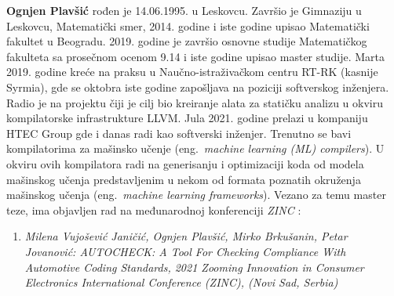 \documentclass[12pt,oneside]{memoir}
\begin{document}
\literatura

\backmatter

\begin{biografija}
  \textbf{Ognjen Plavšić} rođen je 14.06.1995. u Leskovcu. Zavr\v{s}io je Gimnaziju u Leskovcu, Matemati\v{c}ki smer, 2014. godine
  i iste godine upisao Matemati\v{c}ki fakultet u Beogradu. 2019. godine je zavr\v{s}io osnovne studije Matemati\v{c}kog fakulteta sa prose\v{c}nom ocenom 9.14 i iste
  godine upisao master studije. Marta 2019. godine kre\'{c}e na praksu u Nau\v{c}no-istra\v{z}iva\v{c}kom centru RT-RK (kasnije Syrmia), gde
  se oktobra iste godine zapo\v{s}ljava na poziciji softverskog in\v{z}enjera. Radio je na projektu \v{c}iji je cilj bio kreiranje alata za stati\v{c}ku analizu u okviru kompilatorske infrastrukture
  LLVM. Jula 2021. godine prelazi u kompaniju HTEC Group gde i danas
  radi kao softverski in\v{z}enjer. Trenutno se bavi kompilatorima za ma\v{s}insko u\v{c}enje
  (eng.~\textit{machine learning (ML) compilers}). U okviru ovih kompilatora radi na generisanju i optimizaciji koda od modela ma\v{s}inskog u\v{c}enja predstavljenim u nekom od formata poznatih okru\v{z}enja ma\v{s}inskog u\v{c}enja (eng.~\textit{machine learning frameworks}). Vezano za temu master teze, ima objavljen rad na međunarodnoj konferenciji \textit{ZINC} \cite{AutoCheck}: \par
  \begin{enumerate}
    \item{\textit{Milena Vujo\v{s}evi\'{c} Jani\v{c}i\'{c}, Ognjen Plav\v{s}i\'{c}, Mirko Brku\v{s}anin, Petar Jovanovi\'{c}: AUTOCHECK: A Tool For Checking Compliance With Automotive Coding Standards, 2021 Zooming Innovation in Consumer Electronics International Conference (ZINC), (Novi Sad, Serbia)}
    }
    
  \end{enumerate}

\end{biografija}
\end{document}
